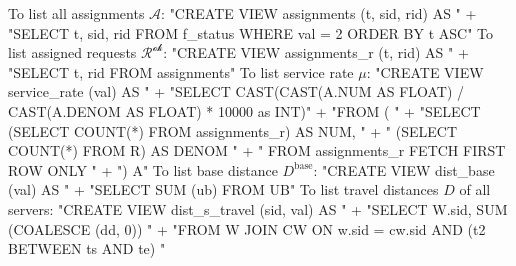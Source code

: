 To list all assignments $\mathcal{A}$:
\nwenddocs{}\endmoddef{}
"CREATE VIEW assignments (t, sid, rid) AS "
  + "SELECT t, sid, rid FROM f_status WHERE val = 2 ORDER BY t ASC"
\nwendcode{}\nwdocspar
To list assigned requests $\mathcal{R^\textrm{ok}}$:
\nwenddocs{}\endmoddef{}
"CREATE VIEW assignments_r (t, rid) AS "
  + "SELECT t, rid FROM assignments"
\nwendcode{}\nwdocspar
To list service rate $\mu$:
\nwenddocs{}\endmoddef{}
"CREATE VIEW service_rate (val) AS "
  + "SELECT CAST(CAST(A.NUM AS FLOAT) / CAST(A.DENOM AS FLOAT) * 10000 as INT)"
  + "FROM ( "
  + "SELECT (SELECT COUNT(*) FROM assignments_r) AS NUM, "
  + "       (SELECT COUNT(*) FROM R) AS DENOM "
  + "       FROM assignments_r FETCH FIRST ROW ONLY "
  + ") A"
\nwendcode{}\nwdocspar
To list base distance $D^\textrm{base}$:
\nwenddocs{}\endmoddef{}
"CREATE VIEW dist_base (val) AS "
  + "SELECT SUM (ub) FROM UB"
\nwendcode{}\nwdocspar
To list travel distances $D$ of all servers:
\nwenddocs{}\endmoddef{}
"CREATE VIEW dist_s_travel (sid, val) AS "
  + "SELECT W.sid, SUM (COALESCE (dd, 0)) "
  + "FROM W JOIN CW ON w.sid = cw.sid AND (t2 BETWEEN ts AND te) "
